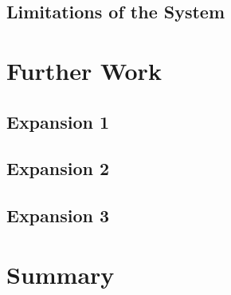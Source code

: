 \documentclass[a4paper, 11pt, twocolumn, twoside]{report}
\begin{document}
\subsection{Limitations of the System}

\section{Further Work}

\subsection{Expansion 1}

\subsection{Expansion 2}

\subsection{Expansion 3}

\section{Summary}


\end{document}
